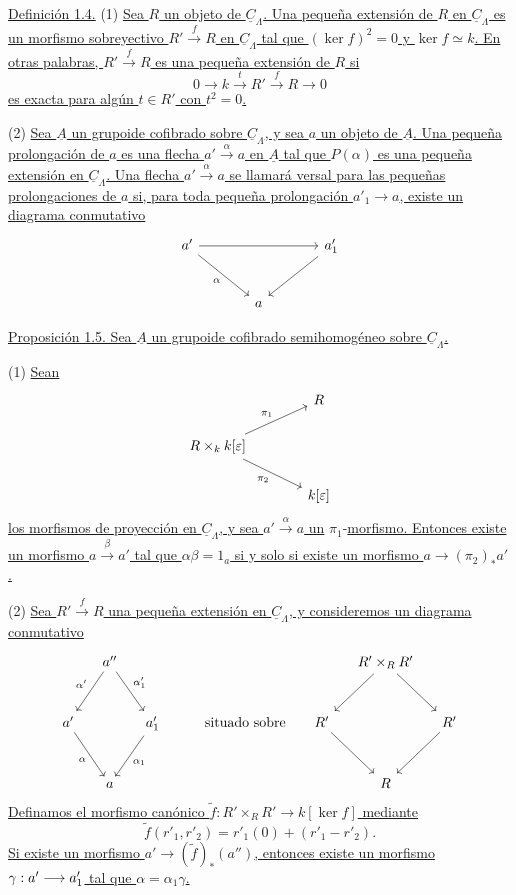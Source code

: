 
\underline{Definición 1.4.} (1) \underline{Sea $R$ un objeto de
$\underline C_\Lambda$. Una pequeña extensión de $R$ en
$\underline C_\Lambda$ es un morfismo sobreyectivo
$R'\xrightarrow{f}R$ en $\underline C_\Lambda$ tal que
$(\ker f)^2=0$ y $\ker f\simeq k$. En otras palabras,
$R'\xrightarrow{f}R$ es una pequeña extensión de $R$ si}
\[
0\longrightarrow k\xrightarrow{t}R'\xrightarrow{f}R
 \longrightarrow0
\]
\underline{es exacta para algún $t\in R'$ con $t^2=0$.}

(2) \underline{Sea $\underline A$ un grupoide cofibrado sobre
$\underline C_\Lambda$, y sea $a$ un objeto de $\underline A$.
Una pequeña prolongación de $a$ es una flecha
$a'\xrightarrow{\alpha}a$ en $\underline A$ tal que $P(\alpha)$ es
una pequeña extensión en $\underline C_\Lambda$. Una flecha
$a'\xrightarrow{\alpha}a$ se llamará versal para las pequeñas
prolongaciones de $a$ si, para toda pequeña prolongación
$a'_1\longrightarrow a$, existe un diagrama conmutativo}
\[
\begin{tikzcd}[row sep=large,column sep=large]
a' \arrow[rr] \arrow[dr,"\alpha"'] & & a'_1 \arrow[dl] \\
& a &
\end{tikzcd}
\]

\underline{Proposición 1.5. Sea $\underline A$ un grupoide cofibrado
semihomogéneo sobre $\underline C_\Lambda$.}

(1) \underline{Sean}
\[
\begin{tikzcd}[column sep=large]
& R \\
R\times_k k[\varepsilon]
 \arrow[ur,"\pi_1"] \arrow[dr,"\pi_2"'] & \\
& k[\varepsilon]
\end{tikzcd}
\]
\underline{los morfismos de proyección en $\underline C_\Lambda$, y
sea $a'\xrightarrow{\alpha}a$ un} $\pi_1$-\underline{morfismo. Entonces existe un
morfismo $a\xrightarrow{\beta}a'$ tal que $\alpha\beta=1_a$ si y solo
si existe un morfismo $a\longrightarrow(\pi_2)_*a'$.}


(2) \underline{Sea $R'\xrightarrow{f}R$ una pequeña extensión en
$\underline C_\Lambda$, y consideremos un diagrama conmutativo}
\[
\begin{tikzcd}[row sep=large,column sep=small]
& a'' \arrow[dl,"\alpha'"'] \arrow[dr,"\alpha'_1"]
  & & & & & R'\times_RR' \arrow[dl] \arrow[dr] & \\
a' \arrow[dr,"\alpha"'] & & \sisi{a'}{a'_1} \arrow[dl,"\alpha_1"]
  & & \underline{\text{situado sobre}} & R' \arrow[dr] & & R' \arrow[dl] \\
& a & & & & & R &
\end{tikzcd}
\]
\underline{Definamos el morfismo canónico
$\widetilde f:R'\times_RR'\longrightarrow k[\ker f]$ mediante}
\[
 \widetilde f(r'_1,r'_2)=r'_1(0)+(r'_1-r'_2).
\]
\underline{Si existe un morfismo
$a'\longrightarrow(\widetilde f)_*(a'')$, entonces existe un morfismo
$\gamma:a'\longrightarrow \sisi{a'}{a'_1}$ tal que
$\alpha=\alpha_1\gamma$.}

